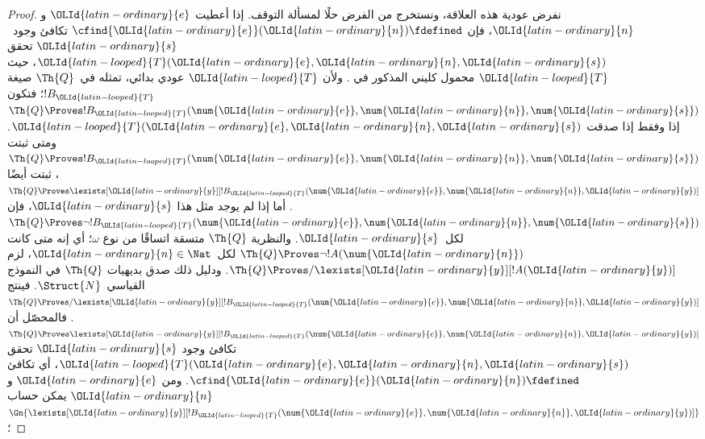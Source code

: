 \documentclass[../../../include/open-logic-section]{subfiles}
\begin{document}
\begin{proof}
نفرض عودية هذه العلاقة، ونستخرج من الفرض حلًا لمسألة التوقف.
إذا أعطيت ${\OLId{latin-ordinary}{e}}$ و${\OLId{latin-ordinary}{n}}$، فإن $\cfind{{\OLId{latin-ordinary}{e}}}({\OLId{latin-ordinary}{n}})\fdefined$ تكافئ وجود~${\OLId{latin-ordinary}{s}}$
تحقق ${\OLId{latin-looped}{T}}({\OLId{latin-ordinary}{e}},{\OLId{latin-ordinary}{n}},{\OLId{latin-ordinary}{s}})$، حيث ${\OLId{latin-looped}{T}}$ محمول كليني المذكور في
.
ولأن ${\OLId{latin-looped}{T}}$ عودي بدائي، تمثله في~$\Th{Q}$ صيغة $!B_{\OLId{latin-looped}{T}}$؛
فتكون $\Th{Q}\Proves !B_{\OLId{latin-looped}{T}}(\num{{\OLId{latin-ordinary}{e}}},\num{{\OLId{latin-ordinary}{n}}},\num{{\OLId{latin-ordinary}{s}}})$
إذا وفقط إذا صدقت ${\OLId{latin-looped}{T}}({\OLId{latin-ordinary}{e}},{\OLId{latin-ordinary}{n}},{\OLId{latin-ordinary}{s}})$.
ومتى ثبتت $\Th{Q}\Proves !B_{\OLId{latin-looped}{T}}(\num{{\OLId{latin-ordinary}{e}}},\num{{\OLId{latin-ordinary}{n}}},\num{{\OLId{latin-ordinary}{s}}})$، ثبتت أيضًا
$\Th{Q}\Proves\lexists[{\OLId{latin-ordinary}{y}}][!B_{\OLId{latin-looped}{T}}(\num{{\OLId{latin-ordinary}{e}}},\num{{\OLId{latin-ordinary}{n}}},{\OLId{latin-ordinary}{y}})]$.
أما إذا لم يوجد مثل هذا ${\OLId{latin-ordinary}{s}}$، فإن
$\Th{Q}\Proves\lnot !B_{\OLId{latin-looped}{T}}(\num{{\OLId{latin-ordinary}{e}}},\num{{\OLId{latin-ordinary}{n}}},\num{{\OLId{latin-ordinary}{s}}})$ لكل~${\OLId{latin-ordinary}{s}}$.
والنظرية $\Th{Q}$ متسقة اتساقًا من نوع $\omega$؛
أي إنه متى كانت $\Th{Q}\Proves\lnot !A(\num{{\OLId{latin-ordinary}{n}}})$
لكل~${\OLId{latin-ordinary}{n}}\in\Nat$، لزم $\Th{Q}\Proves/\lexists[{\OLId{latin-ordinary}{y}}][!A({\OLId{latin-ordinary}{y}})]$.
ودليل ذلك صدق بديهيات $\Th{Q}$ في النموذج القياسي~$\Struct{N}$.
فينتج $\Th{Q}\Proves/\lexists[{\OLId{latin-ordinary}{y}}][!B_{\OLId{latin-looped}{T}}(\num{{\OLId{latin-ordinary}{e}}},\num{{\OLId{latin-ordinary}{n}}},{\OLId{latin-ordinary}{y}})]$.
فالمحصّل أن $\Th{Q}\Proves\lexists[{\OLId{latin-ordinary}{y}}][!B_{\OLId{latin-looped}{T}}(\num{{\OLId{latin-ordinary}{e}}},\num{{\OLId{latin-ordinary}{n}}},{\OLId{latin-ordinary}{y}})]$
تكافئ وجود ${\OLId{latin-ordinary}{s}}$ تحقق ${\OLId{latin-looped}{T}}({\OLId{latin-ordinary}{e}},{\OLId{latin-ordinary}{n}},{\OLId{latin-ordinary}{s}})$، أي تكافئ
$\cfind{{\OLId{latin-ordinary}{e}}}({\OLId{latin-ordinary}{n}})\fdefined$.
ومن ${\OLId{latin-ordinary}{e}}$ و${\OLId{latin-ordinary}{n}}$ يمكن حساب
$\Gn{\lexists[{\OLId{latin-ordinary}{y}}][!B_{\OLId{latin-looped}{T}}(\num{{\OLId{latin-ordinary}{e}}},\num{{\OLId{latin-ordinary}{n}}},{\OLId{latin-ordinary}{y}})]}$؛

\end{proof}
\end{document}
